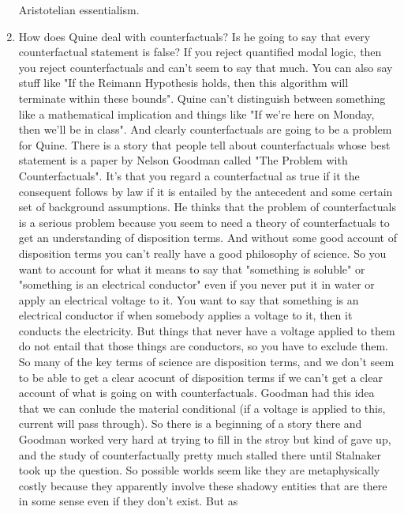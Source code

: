 \documentclass[12pt]{article}
\theoremstyle{definition}
\begin{document}
\begin{enumerate}
        Aristotelian essentialism.
    \item
        How does Quine deal with counterfactuals? Is he going to say that every
        counterfactual statement is false? If you reject quantified modal
        logic, then you reject counterfactuals and can't seem to say that much.
        You can also say stuff like "If the Reimann Hypothesis holds, then this
        algorithm will terminate within these bounds". Quine can't distinguish
        between something like a mathematical implication and things like "If
        we're here on Monday, then we'll be in class". And clearly
        counterfactuals are going to be a problem for Quine. There is a story
        that people tell about counterfactuals whose best statement is a paper
        by Nelson Goodman called "The Problem with Counterfactuals". It's that
        you regard a counterfactual as true if it the consequent follows by law
        if it is entailed by the antecedent and some certain set of background
        assumptions. He thinks that the problem of counterfactuals is a serious
        problem because you seem to need a theory of counterfactuals to get an
        understanding of disposition terms. And without some good account of
        disposition terms you can't really have a good philosophy of science.
        So you want to account for what it means to say that "something is
        soluble" or "something is an electrical conductor" even if you never
        put it in water or apply an electrical voltage to it. You want to say
        that something is an electrical conductor if when somebody applies a
        voltage to it, then it conducts the electricity. But things that never
        have a voltage applied to them do not entail that those things are
        conductors, so you have to exclude them. So many of the key terms of
        science are disposition terms, and we don't seem to be able to get a
        clear acocunt of disposition terms if we can't get a clear account of
        what is going on with counterfactuals. Goodman had this idea that we
        can conlude the material conditional (if a voltage is applied to this,
        current will pass through). So there is a beginning of a story there
        and Goodman worked very hard at trying to fill in the stroy but kind of
        gave up, and the study of counterfactually pretty much stalled there
        until Stalnaker took up the question. So possible worlds seem like they
        are metaphysically costly because they apparently involve these shadowy
        entities that are there in some sense even if they don't exist. But as

\end{enumerate}
\end{document}
